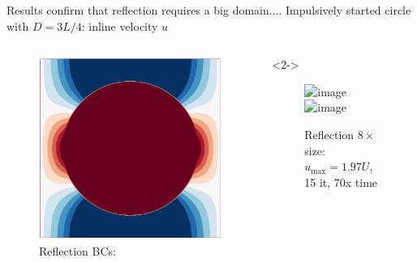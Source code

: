 \documentclass[aspectratio=169,small]{beamer}
\begin{document}
\begin{frame}[fragile]{Results confirm that reflection requires a big domain....} %
    \small{Impulsively started circle with $D=3L/4$: inline velocity $u$}
    
    \begin{columns}[onlytextwidth]
        \begin{column}{.5\textwidth}
        \begin{figure}
            \centering
            \includegraphics[height=0.6\textwidth]{fig/reflection_tight.png}
            \caption*{Reflection BCs: \\ }
        \end{figure}
        \end{column}
        \begin{column}{.5\textwidth}<2->
        \begin{figure}
            \centering
            \includegraphics<2>[height=0.6\textwidth]{fig/reflection_big.png}
            \includegraphics<3>[height=0.6\textwidth]{fig/reflection_zoom.png}
            \caption*{Reflection {\color{red}$8\times$size}: \\ $u_\text{max}=1.97U$, {\color{red} 15 it, 70x time}}
        \end{figure}
        \end{column}
    \end{columns}
\end{frame}
\end{document}
